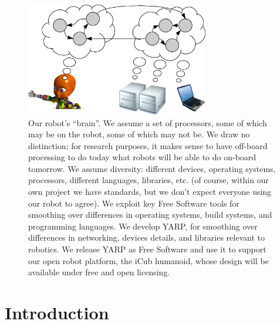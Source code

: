 

\begin{figure}
\centerline{
\includegraphics[width=8cm]{fig-nethead}
}
\caption{
%
Our robot's ``brain''.
We assume a set of processors, some of which may
be on the robot, some of which may not be. We draw no 
distinction; for research purposes, it makes sense to
have off-board processing to do today what robots will
be able to do on-board tomorrow.
%
We assume diversity:
different devices, operating systems, processors, different languages,
libraries, etc. (of course, within our own project we have standards,
but we don't expect everyone using our robot to agree).
%
%
We exploit key Free Software tools for smoothing over differences in
operating systems, build systems, and programming languages.
%
We develop YARP, for smoothing over differences in networking,
devices details, and libraries relevant to robotics.
%
%
%
%
We release YARP as Free Software
 and use it to support our open robot
platform, the iCub humanoid, whose design will be available under free
and open licensing.
%
}
\end{figure}


\section{Introduction}




